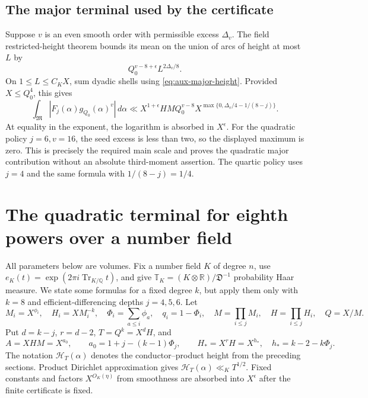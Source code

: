 \documentclass[11pt,reqno]{amsart}
\numberwithin{equation}{section}
\theoremstyle{definition}
\begin{document}
\subsection{The major terminal used by the certificate}

Suppose $v$ is an even smooth order with permissible excess $\Delta_v$.
The field restricted-height theorem bounds its mean on the union of arcs
of height at most $L$ by
\[
 Q_0^{v-8+\epsilon}L^{2\Delta_v/8}.
\]
On $1\le L\le C_KX$, sum dyadic shells using
\eqref{eq:aux-major-height}.  Provided $X\le Q_0^4$, this gives
\begin{equation}\label{eq:aux-major-terminal-8}
 \int_{\mathfrak M}|F_j(\alpha)g_{Q_0}(\alpha)^v|\,d\alpha
 \ll X^{1+\epsilon}HM Q_0^{v-8}
       X^{\max\{0,\Delta_v/4-1/(8-j)\}}.
\end{equation}
At equality in the exponent, the logarithm is absorbed in $X^\epsilon$.
For the quadratic policy $j=6,v=16$, the seed excess is less than two,
so the displayed maximum is zero.  This is precisely the required main
scale and proves the quadratic major contribution without an absolute
third-moment assertion.  The quartic policy uses $j=4$ and the same formula
with $1/(8-j)=1/4$.


\section{The quadratic terminal for eighth powers over a number field}
\label{sec:eighth-quadratic-terminal}

All parameters below are volumes. Fix a number field $K$ of degree $n$,
use $e_K(t)=\exp(2\pi i\operatorname{Tr}_{K/\mathbb Q}t)$, and give
$\mathbb T_K=(K\otimes\mathbb R)/\mathfrak D^{-1}$ probability Haar measure.
We state some formulas for a fixed degree $k$, but apply them only with
$k=8$ and efficient-differencing depths $j=4,5,6$.
Let
\[
 M_i=X^{\phi_i},\quad H_i=XM_i^{-k},\quad
 \Phi_i=\sum_{a\le i}\phi_a,\quad q_i=1-\Phi_i,
 \quad M=\prod_{i\le j}M_i,\quad H=\prod_{i\le j}H_i,
 \quad Q=X/M.
\]
Put $d=k-j$, $r=d-2$, $T=Q^k=X^dH$, and
\[
 A=XHM=X^{a_0},\qquad a_0=1+j-(k-1)\Phi_j,\qquad
 H_*=X^rH=X^{h_*},\quad h_*=k-2-k\Phi_j.
\]
The notation $\mathcal H_T(\alpha)$ denotes the conductor--product height
from the preceding sections. Product Dirichlet approximation gives
$\mathcal H_T(\alpha)\ll_K T^{1/2}$.
Fixed constants and factors $X^{O_K(\eta)}$ from smoothness are absorbed
into $X^\epsilon$ after the finite certificate is fixed.
\end{document}
